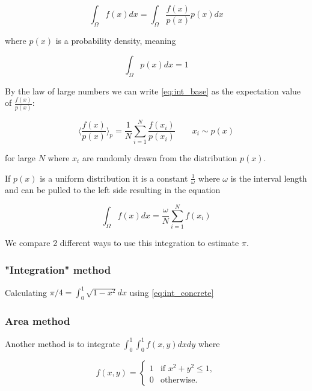 \documentclass[a4paper, 11pt]{article}          %
\begin{document}
    \begin{equation}
        \label{eq:int_base}
        \int_{\Omega} f(x) dx = \int_\Omega \frac{f(x)}{p(x)} p(x) dx
    \end{equation}

    where $p(x)$ is a probability density, meaning

    \begin{equation*}
        \int_{\Omega} p(x) dx = 1
    \end{equation*}

    By the law of large numbers we can write \eqref{eq:int_base} as the expectation value of $\frac{f(x)}{p(x)}$:

    \begin{equation}
        \label{eq:expect_value}
        \langle \frac{f(x)}{p(x)} \rangle_{p} = \frac{1}{N} \sum_{i=1}^N \frac{f(x_i)}{p(x_i)} \qquad x_i \sim p(x)
    \end{equation}

    for large $N$ where $x_i$ are randomly drawn from the distribution $p(x)$.

    If $p(x)$ is a uniform distribution it is a constant $\frac{1}{\omega}$ where $\omega$ is the interval length and can be pulled to the left side resulting in the equation

    \begin{equation}
        \label{eq:int_concrete}
        \int_{\Omega} f(x) dx = \frac{\omega}{N} \sum_{i=1}^N f(x_i)
    \end{equation}

    We compare 2 different ways to use this integration to estimate $\pi$.

    \subsubsection{"Integration" method}
    Calculating $\pi/4 = \int_0^1 \sqrt{1-x^2} dx$ using \eqref{eq:int_concrete}
    \subsubsection{Area method}
    Another method is to integrate $\int_0^1\int_0^1 f(x,y) dx dy$ where

    \begin{equation*}
        f(x,y) = \begin{cases}
                     1 & \text{if } x^2 + y^2 \le 1, \\
                     0 & \text{otherwise.}
        \end{cases}
    \end{equation*}
\end{document}
